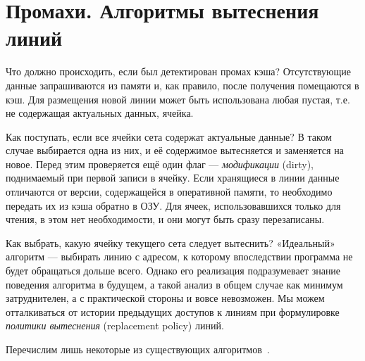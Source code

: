 \section{Промахи. Алгоритмы вытеснения линий}

Что должно происходить, если был детектирован промах кэша? Отсутствующие данные запрашиваются из памяти и, как правило, после получения помещаются в кэш. Для размещения новой линии может быть использована любая пустая, т.е. не содержащая актуальных данных, ячейка.

Как поступать, если все ячейки сета содержат актуальные данные? В таком случае выбирается одна из них, и её содержимое вытесняется и заменяется на новое. Перед этим проверяется ещё один флаг --- \textit{модификации} (\abbr dirty), поднимаемый при первой записи в ячейку. Если хранящиеся  в линии данные отличаются от версии, содержащейся в оперативной памяти, то необходимо передать их из кэша обратно в ОЗУ. Для ячеек, использовавшихся только для чтения, в этом нет необходимости, и они могут быть сразу перезаписаны.

Как выбрать, какую ячейку текущего сета следует вытеснить? «Идеальный» алгоритм --- выбирать линию с адресом, к которому впоследствии программа не будет обращаться дольше всего. Однако  его реализация подразумевает знание поведения алгоритма в будущем, а такой анализ в общем случае как минимум затруднителен, а с практической стороны и вовсе невозможен. Мы можем отталкиваться от истории предыдущих доступов к линиям при формулировке \textit{политики вытеснения} (\abbr replacement policy) линий.

Перечислим лишь некоторые из существующих алгоритмов~\cite{arc}.


